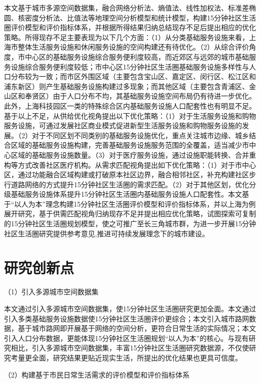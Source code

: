 \documentclass{shnuthesis}
\begin{document}
本文基于城市多源空间数据集，融合网络分析法、熵值法、线性加权法、标准差椭圆、核密度分析法、比值法等地理空间分析模型和统计模型，构建15分钟社区生活圈评价模型和评价指标体系，并根据所得结果归纳总结现存不足后提出相应的优化策略。所得现存不足主要表现为以下几个方面：（1）从分类基础服务设施来看，上海市整体生活服务设施和休闲服务设施的空间构建还有待优化。（2）从综合评价角度，市中心区的基础服务设施综合服务便利度较高，而近郊区与远郊的城市基础服务设施综合服务便利度较低；市中心区15分钟社区生活圈基础服务设施多样性与人口分布较为一致；而市区外围区域（主要包含宝山区、嘉定区、闵行区、松江区和浦东新区）则产生基础服务设施构建过多现象；而其他区域（主要包含青浦区、金山区和奉贤区）由于人口分布不均，其基础服务设施空间布局仍有待进一步优化。此外，上海科技园区一类的特殊综合区内基础服务设施人口配套性也有明显不足。基于以上不足，从供给优化视角提出以下优化策略：（1）对于生活服务设施和购物服务设施，可通过发展社区商业模式促进新型生活服务设施和购物服务设施的发展。（2）对于不同区划不同类别的基础服务设施优化，重点关注城市边缘、城乡结合区域的基础服务设施构建，完善基础服务设施服务范围的全覆盖，适当减少市中心区域的基础服务设施数量。（3）对于医疗服务设施，通过设施职能转换、合并重构等方式改善社区医疗机构。从需求匹配视角提出如下优化策略：（1）对于市中心区，通过功能融合区域构建或打破原本社区边界，融合相邻社区，补充构建社区步行道路网络的方式提升15分钟社区生活圈的需求匹配。（2）对于其他区划，优化分级基础服务设施体系提升15分钟社区生活圈内基础服务设施人口配套性。本文基于“以人为本”理念构建15分钟社区生活圈评价模型和评价指标体系，并以上海为例展开研究，基于供需匹配视角归纳现存不足并提出相应优化策略，试图探索可复制的15分钟社区生活圈规划模型，使之可推广至长三角城市群，为进一步开展15分钟社区生活圈研究提供参考意见,推进可持续发展理念下的城市建设。

\section{研究创新点}

（1）引入多源城市空间数据集

本文通过引入多源城市空间数据集，使15分钟社区生活圈研究更加全面。本文通过引入多类基础服务设施数据使15分钟社区生活圈评价更综合；本文引入城市路网数据，基于城市路网即开展基于网络的空间分析，更符合日常生活的实际情况；本文引入人口分布数据，更能体现15分钟社区生活圈规划“以人为本”的核心。与现有研究相比，引入多源城市空间数据集，丰富15分钟社区生活圈研究数据源，不仅使研究考量更全面，研究结果更贴近现实生活，所提出的优化结果也更具可信度。

（2）构建基于市民日常生活需求的评价模型和评价指标体系
\end{document}
